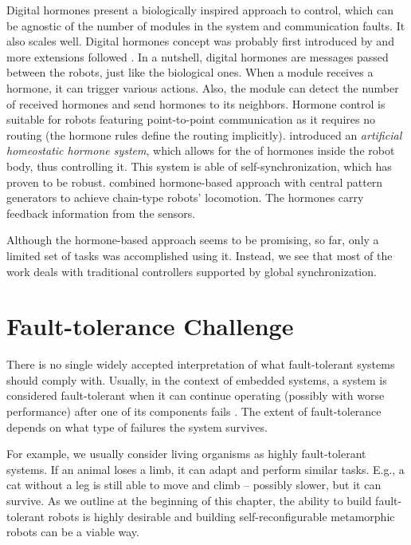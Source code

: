 Digital hormones present a biologically inspired approach to control, which can
be agnostic of the number of modules in the system and communication faults. It
also scales well. Digital hormones concept was probably first introduced by
\textcite{DBLP:conf/agents/ShenLW00} and more extensions followed
\cite{DBLP:conf/icra/SalemiSW01, DBLP:journals/trob/ShenSW02}. In a nutshell,
digital hormones are messages passed between the robots, just like the
biological ones. When a module receives a hormone, it can trigger various
actions. Also, the module can detect the number of received hormones and send
hormones to its neighbors. Hormone control is suitable for robots featuring
point-to-point communication as it requires no routing (the hormone rules define
the routing implicitly). \textcite{DBLP:conf/cec/HamannSSC10} introduced an
\emph{artificial homeostatic hormone system}, which allows for the
 of hormones inside the robot body, thus controlling it. This
system is able of self-synchronization, which has proven to be robust.
\textcite{DBLP:conf/icra/MorenoG11} combined hormone-based approach with central
pattern generators to achieve chain-type robots' locomotion. The hormones
carry feedback information from the sensors.

Although the hormone-based approach seems to be promising, so far, only a
limited set of tasks was accomplished using it. Instead, we see that most of the
work deals with traditional controllers supported by global synchronization.

\section{Fault-tolerance Challenge}

There is no single widely accepted interpretation of what fault-tolerant systems
should comply with. Usually, in the context of embedded systems, a system is
considered fault-tolerant when it can continue operating (possibly with
worse performance) after one of its components fails
\cite{DBLP:journals/micro/Johnson84}. The extent of fault-tolerance depends on
what type of failures the system survives.

For example, we usually consider living organisms as highly fault-tolerant
systems. If an animal loses a limb, it can adapt and perform similar
tasks. E.g., a cat without a leg is still able to move and climb -- possibly
slower, but it can survive. As we outline at the beginning of this
chapter, the ability to build fault-tolerant robots is highly desirable and
building self-reconfigurable metamorphic robots can be a viable way.


